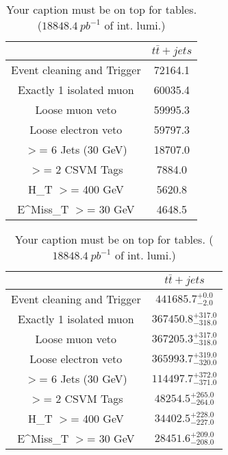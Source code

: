 \documentclass{article}
\begin{document}
\begin{table}
\caption{Your caption must be on top for tables. ($18848.4~pb^{-1}$ of int. lumi.)}
\label{tab:}
\centering
\begin{tabular}{|c|c|}
\toprule
&$t\bar{t}+jets$	\\

\midrule
Event cleaning and Trigger&	72164.1	\\

Exactly 1 isolated muon&	60035.4	\\

Loose muon veto&	59995.3	\\

Loose electron veto&	59797.3	\\

$>$= 6 Jets (30 GeV)&	18707.0	\\

$>$= 2 CSVM Tags&	7884.0	\\

H_{T} $>$=  400 GeV&	5620.8	\\

E^{Miss}_{T} $>$=  30 GeV&	4648.5	\\

\bottomrule
\end{tabular}
\end{table}
\begin{table}
\caption{Your caption must be on top for tables. ($18848.4~pb^{-1}$ of int. lumi.)}
\label{tab:}
\centering
\begin{tabular}{|c|c|}
\toprule
&$t\bar{t}+jets$	\\

\midrule
Event cleaning and Trigger&	$441685.7^{+0.0}_{-2.0}$	\\

Exactly 1 isolated muon&	$367450.8^{+317.0}_{-318.0}$	\\

Loose muon veto&	$367205.3^{+317.0}_{-318.0}$	\\

Loose electron veto&	$365993.7^{+319.0}_{-320.0}$	\\

$>$= 6 Jets (30 GeV)&	$114497.7^{+372.0}_{-371.0}$	\\

$>$= 2 CSVM Tags&	$48254.5^{+265.0}_{-264.0}$	\\

H_{T} $>$=  400 GeV&	$34402.5^{+228.0}_{-227.0}$	\\

E^{Miss}_{T} $>$=  30 GeV&	$28451.6^{+209.0}_{-208.0}$	\\

\bottomrule
\end{tabular}
\end{table}
\end{document}
